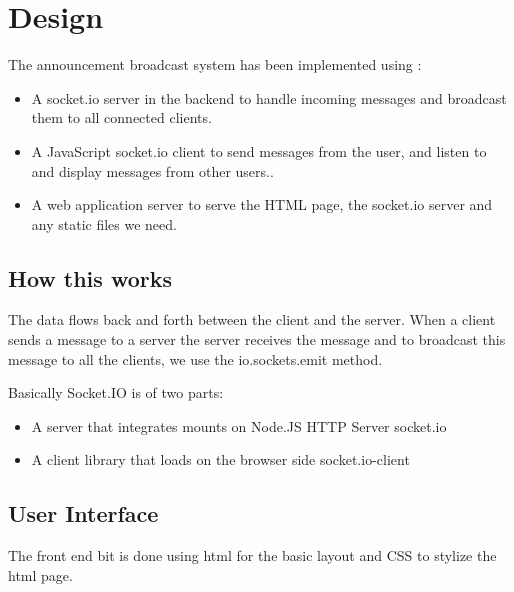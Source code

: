 \documentclass{fisatproject}
\begin{document}
\section{Design}

The announcement broadcast system has been implemented using : 
  \begin{itemize}
 \item A socket.io server in the backend to handle incoming messages and broadcast them to all connected clients.
 \item A JavaScript socket.io client to send messages from the user, and listen to and display messages from other users..
 \item A web application server to serve the HTML page, the socket.io server and any static files we need.
 \end{itemize}

   \subsection{How this works}
   
   The data flows back and forth between the client and the server. When a client sends a message to a server the server receives the message and to broadcast this message to all the clients, we use the io.sockets.emit method.
   
   Basically Socket.IO is of two parts:
\begin{itemize}
    \item A server that integrates mounts on Node.JS HTTP Server socket.io
    \item A client library that loads on the browser side socket.io-client
\end{itemize}



   \vspace{1cm}
  
 
    
    \vspace{1cm}
    \subsection{User Interface}
    The front end bit is done using html for the basic layout and CSS to stylize the html page.    
    \newpage
\end{document}
